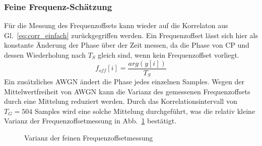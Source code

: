 \subsubsection{Feine Frequenz-Schätzung}
Für die Messung des Frequenzoffsets kann wieder auf die Korrelaton aus Gl.~\ref{eq:corr_einfach} zurückgegriffen werden. Ein Frequenzoffset lässt sich hier als konstante Änderung der Phase über der Zeit messen, da die Phase von \ac{CP} und dessen Wiederholung nach $T_S$ gleich sind, wenn kein Frequenzoffset vorliegt. 
\begin{equation}
f_{off}[i] = \frac{arg(y[i])}{T_S}
\label{eq:fine_frequency_estimation}
\end{equation}
Ein zusätzliches \ac{AWGN} ändert die Phase jedes einzelnen Samples. Wegen der Mittelwertfreiheit von \ac{AWGN} kann die Varianz des gemessenen Frequenzoffsets durch eine Mittelung reduziert werden.
Durch das Korrelationsintervall von $T_G = 504$ Samples wird eine solche Mittelung durchgeführt, was die relativ kleine Varianz der Frequenzoffsetmessung in Abb.~\ref{plot:varianz_freq_offset} bestätigt.
\begin{figure}[htb]
\begin{center}
\end{center}
\caption{Varianz der feinen Frequenzoffsetmessung}
\label{plot:varianz_freq_offset}
\end{figure}

